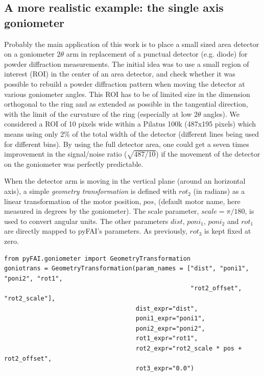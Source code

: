 \documentclass[preprint]{iucr}              %
\begin{document}
\subsection{A more realistic example: the single axis goniometer}

Probably the main application of this work is to place a small sized area detector
on a goniometer $2\theta$ arm in replacement of a punctual detector (e.g. diode) for 
powder diffraction measurements. 
The initial idea was to use a small region of interest (ROI) in the center of
an area detector, and check whether it was possible to rebuild a powder diffraction pattern
when moving the detector at various goniometer angles.
This ROI has to be of limited size in the dimension orthogonal to the ring and as extended
as possible in the tangential direction, with the limit of the curvature of the ring 
(especially at low $2\theta$ angles).
We considered a ROI of 10 pixels wide within a Pilatus 100k (487x195 pixels)
which means using only 2\% of the total width of the detector (different lines being used for different bins). 
By using the full detector area, one could get a seven times improvement in the signal/noise ratio
($\sqrt{487/10}$) if the movement of the detector on the goniometer was perfectly predictable.

When the detector arm is moving in the vertical plane (around an horizontal axis), 
a simple \textit{geometry transformation} is defined with $rot_2$ (in radians) as a
linear transformation of the motor position, $pos$, (default motor name, here measured in degrees by the goniometer).
The scale parameter, $scale = \pi / 180$, is used to convert angular units.
The other parameters $dist$, $poni_1$, $poni_2$ and $rot_1$ are directly mapped
to pyFAI's parameters.
As previously, $rot_3$ is kept fixed at zero.

\begin{verbatim}
from pyFAI.goniometer import GeometryTransformation
goniotrans = GeometryTransformation(param_names = ["dist", "poni1", "poni2", "rot1",
                                                   "rot2_offset", "rot2_scale"],
                                    dist_expr="dist", 
                                    poni1_expr="poni1",
                                    poni2_expr="poni2", 
                                    rot1_expr="rot1", 
                                    rot2_expr="rot2_scale * pos + rot2_offset", 
                                    rot3_expr="0.0")
\end{verbatim}
\end{document}
